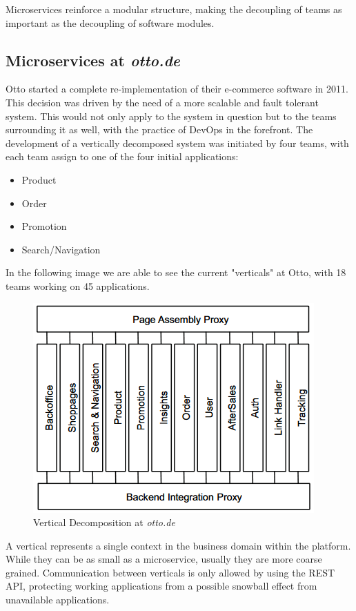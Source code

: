 \documentclass[14pt]{extarticle}
\begin{document}
Microservices reinforce a modular structure, making the decoupling of teams as important as the decoupling of software modules.

\subsection{Microservices at \textit{otto.de}}

Otto started a complete re-implementation of their e-commerce software in 2011. This decision was driven by the need of a more scalable and fault tolerant system. This would not only apply to the system in question but to the teams surrounding it as well, with the practice of DevOps in the forefront.
The development of a vertically decomposed system was initiated by four teams, with each team assign to one of the four initial applications:
\begin{itemize}
	\item Product
	\item Order
	\item Promotion
	\item Search/Navigation
\end{itemize}

In the following image we are able to see the current "verticals" at Otto, with 18 teams working on 45 applications.

\begin{figure}[H]
	\centering
	  \includegraphics[scale=0.75]{vertical_decomposition.png}
	\caption{Vertical Decomposition at \textit{otto.de}}
  \end{figure}

A vertical represents a single context in the business domain within the platform. While they can be as small as a microservice, usually they are more coarse grained. Communication between verticals is only allowed by using the REST API, protecting working applications from a possible snowball effect from unavailable applications.
\end{document}

